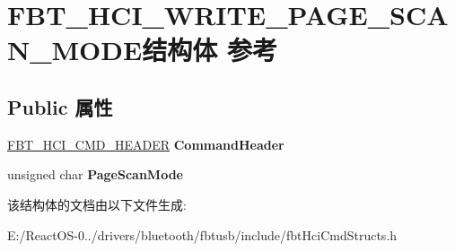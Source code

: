 \hypertarget{struct_f_b_t___h_c_i___w_r_i_t_e___p_a_g_e___s_c_a_n___m_o_d_e}{}\section{F\+B\+T\+\_\+\+H\+C\+I\+\_\+\+W\+R\+I\+T\+E\+\_\+\+P\+A\+G\+E\+\_\+\+S\+C\+A\+N\+\_\+\+M\+O\+D\+E结构体 参考}
\label{struct_f_b_t___h_c_i___w_r_i_t_e___p_a_g_e___s_c_a_n___m_o_d_e}
\subsection*{Public 属性}
\begin{DoxyCompactItemize}
\item 
\mbox{\label{struct_f_b_t___h_c_i___w_r_i_t_e___p_a_g_e___s_c_a_n___m_o_d_e_a4b4dc01142cd33b63fa62bd708055f39}} 
\hyperlink{struct_f_b_t___h_c_i___c_m_d___h_e_a_d_e_r}{F\+B\+T\+\_\+\+H\+C\+I\+\_\+\+C\+M\+D\+\_\+\+H\+E\+A\+D\+ER} {\bfseries Command\+Header}
\item 
\mbox{\label{struct_f_b_t___h_c_i___w_r_i_t_e___p_a_g_e___s_c_a_n___m_o_d_e_a3797bb53c35106c24b311e73e6065052}} 
unsigned char {\bfseries Page\+Scan\+Mode}
\end{DoxyCompactItemize}


该结构体的文档由以下文件生成\+:\begin{DoxyCompactItemize}
\item 
E\+:/\+React\+O\+S-\/0../drivers/bluetooth/fbtusb/include/fbt\+Hci\+Cmd\+Structs.\+h\end{DoxyCompactItemize}
